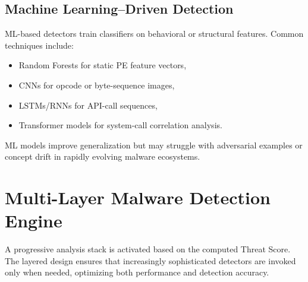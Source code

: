\documentclass[12pt, a4paper]{report}
\begin{document}
\subsection{Machine Learning–Driven Detection}
ML-based detectors train classifiers on behavioral or structural features.
Common techniques include:
\begin{itemize}
    \item Random Forests for static PE feature vectors,
    \item CNNs for opcode or byte-sequence images,
    \item LSTMs/RNNs for API-call sequences,
    \item Transformer models for system-call correlation analysis.
\end{itemize}
ML models improve generalization but may struggle with adversarial examples
or concept drift in rapidly evolving malware ecosystems.
\section{Multi-Layer Malware Detection Engine}

A progressive analysis stack is activated based on the computed Threat Score. 
The layered design ensures that increasingly sophisticated detectors are invoked 
only when needed, optimizing both performance and detection accuracy.
\end{document}
